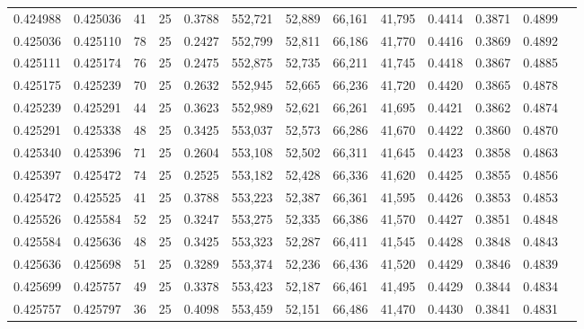 \begin{tabular}{rrrrrrrrrrrrr}
0.424988 & 0.425036 &    41 &  25 &                                     0.3788 & 552,721 &  52,889 &  66,161 &  41,795 & 0.4414 & 0.3871 & 0.4899 \\
0.425036 & 0.425110 &    78 &  25 &                                     0.2427 & 552,799 &  52,811 &  66,186 &  41,770 & 0.4416 & 0.3869 & 0.4892 \\
0.425111 & 0.425174 &    76 &  25 &                                     0.2475 & 552,875 &  52,735 &  66,211 &  41,745 & 0.4418 & 0.3867 & 0.4885 \\
0.425175 & 0.425239 &    70 &  25 &                                     0.2632 & 552,945 &  52,665 &  66,236 &  41,720 & 0.4420 & 0.3865 & 0.4878 \\
0.425239 & 0.425291 &    44 &  25 &                                     0.3623 & 552,989 &  52,621 &  66,261 &  41,695 & 0.4421 & 0.3862 & 0.4874 \\
0.425291 & 0.425338 &    48 &  25 &                                     0.3425 & 553,037 &  52,573 &  66,286 &  41,670 & 0.4422 & 0.3860 & 0.4870 \\
0.425340 & 0.425396 &    71 &  25 &                                     0.2604 & 553,108 &  52,502 &  66,311 &  41,645 & 0.4423 & 0.3858 & 0.4863 \\
0.425397 & 0.425472 &    74 &  25 &                                     0.2525 & 553,182 &  52,428 &  66,336 &  41,620 & 0.4425 & 0.3855 & 0.4856 \\
0.425472 & 0.425525 &    41 &  25 &                                     0.3788 & 553,223 &  52,387 &  66,361 &  41,595 & 0.4426 & 0.3853 & 0.4853 \\
0.425526 & 0.425584 &    52 &  25 &                                     0.3247 & 553,275 &  52,335 &  66,386 &  41,570 & 0.4427 & 0.3851 & 0.4848 \\
0.425584 & 0.425636 &    48 &  25 &                                     0.3425 & 553,323 &  52,287 &  66,411 &  41,545 & 0.4428 & 0.3848 & 0.4843 \\
0.425636 & 0.425698 &    51 &  25 &                                     0.3289 & 553,374 &  52,236 &  66,436 &  41,520 & 0.4429 & 0.3846 & 0.4839 \\
0.425699 & 0.425757 &    49 &  25 &                                     0.3378 & 553,423 &  52,187 &  66,461 &  41,495 & 0.4429 & 0.3844 & 0.4834 \\
0.425757 & 0.425797 &    36 &  25 &                                     0.4098 & 553,459 &  52,151 &  66,486 &  41,470 & 0.4430 & 0.3841 & 0.4831 \\

\end{tabular}
